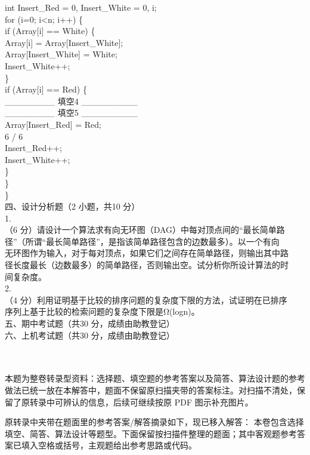\begin{question}
int Insert\_Red = 0, Insert\_White = 0, i;\\
for (i=0; i<n; i++) \{\\
if (Array[i] == White) \{\\
Array[i] = Array[Insert\_White];\\
Array[Insert\_White] = White;\\
Insert\_White++;\\
\}\\
if (Array[i] == Red) \{\\
\_\_\_\_\_\_\_\_ 填空4 \_\_\_\_\_\_\_\_\_\\
\_\_\_\_\_\_\_\_ 填空5 \_\_\_\_\_\_\_\_\_\\
Array[Insert\_Red] = Red;\\
6 / 6\\
Insert\_Red++;\\
Insert\_White++;\\
\}\\
\}\\
\}\\
四、设计分析题（2 小题，共10 分）\\
1.\\
（6 分）请设计一个算法求有向无环图（DAG）中每对顶点间的“最长简单路\\
径”（所谓“最长简单路径”，是指该简单路径包含的边数最多）。以一个有向\\
无环图作为输入，对于每对顶点，如果它们之间存在简单路径，则输出其中路\\
径长度最长（边数最多）的简单路径，否则输出空。试分析你所设计算法的时\\
间复杂度。\\
2.\\
（4 分）利用证明基于比较的排序问题的复杂度下限的方法，试证明在已排序\\
序列上基于比较的检索问题的复杂度下限是Ω(logn)。\\
五、期中考试题（共30 分，成绩由助教登记）\\
六、上机考试题（共30 分，成绩由助教登记）\\
\\
\

\begin{solution}
本题为整卷转录型资料：选择题、填空题的参考答案以及简答、算法设计题的参考做法已统一放在本解答中，题面不保留原扫描夹带的答案标注。对扫描不清处，保留了原转录中可辨认的信息，后续可继续按原 PDF 图示补充图片。

\medskip
\noindent 原转录中夹带在题面里的参考答案/解答摘录如下，现已移入解答：
本卷包含选择填空、简答、算法设计等题型。下面保留按扫描件整理的题面；其中客观题参考答案已填入空格或括号，主观题给出参考思路或代码。


\end{solution}
\end{question}
